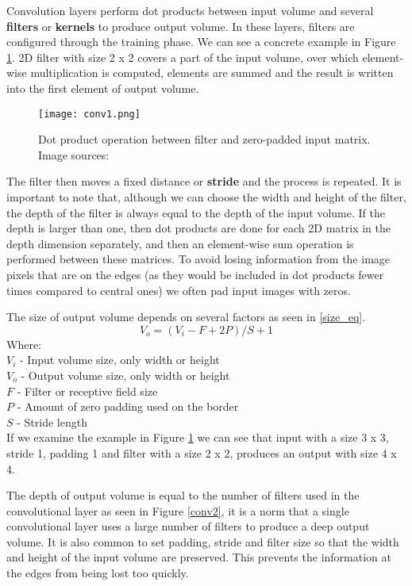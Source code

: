 Convolution layers perform dot products between input volume and several \textbf{filters} or \textbf{kernels} to produce output volume.
In these layers, filters are configured through the training phase.
We can see a concrete example in Figure \ref{conv1}.
2D filter with size 2 x 2 covers a part of the input volume, over which element-wise multiplication is computed, elements are summed and the result is written into the first element of output volume.

\begin{figure}[ht] 
    \centering
    \texttt{[image: conv1.png]} 
\caption[Dot product operation between filter and zero-padded input matrix.] {Dot product operation between filter and zero-padded input matrix. Image sources: \cite{conv_layer_img}}
    \label{conv1}
\end{figure}

The filter then moves a fixed distance or \textbf{stride} and the process is repeated.
It is important to note that, although we can choose the width and height of the filter, the depth of the filter is always equal to the depth of the input volume.
If the depth is larger than one, then dot products are done for each 2D matrix in the depth dimension separately, and then an element-wise sum operation is performed between these matrices.
To avoid losing information from the image pixels that are on the edges (as they would be included in dot products fewer times compared to central ones) we often pad input images with zeros.

The size of output volume depends on several factors as seen in \ref{size_eq}.
\begin{equation}\label{size_eq}
V_{o} = (V_{i} - F + 2P) / S + 1
\end{equation}
Where:\\
$V_{i}$ - Input volume size, only width or height\\
$V_{o}$ - Output volume size, only width or height\\
$F$ - Filter or receptive field size\\
$P$ - Amount of zero padding used on the border\\
$S$ - Stride length\\

If we examine the example in Figure \ref{conv1} we can see that input with a size 3 x 3, stride 1, padding 1 and filter with a size 2 x 2, produces an output with size 4 x 4.

The depth of output volume is equal to the number of filters used in the convolutional layer as seen in Figure \ref{conv2}, it is a norm that a single convolutional layer uses a large number of filters to produce a deep output volume\cite{cs231n}.
It is also common to set padding, stride and filter size so that the width and height of the input volume are preserved.
This prevents the information at the edges from being lost too quickly\cite{cs231n}.


